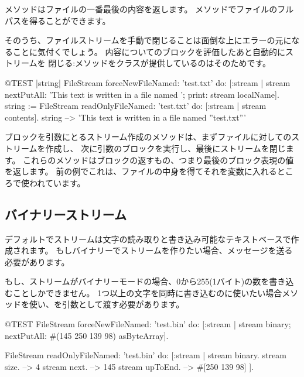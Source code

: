 \documentclass[a4paper,10pt,twoside]{book}
\begin{document}
メソッドはファイルの一番最後の内容を返します。
メソッドでファイルのフルパスを得ることができます。


そのうち、ファイルストリームを手動で閉じることは面倒な上にエラーの元になることに気付くでしょう。
内容についてのブロックを評価したあと自動的にストリームを
閉じる:メソッドをクラスが提供しているのはそのためです。


\begin{code}{@TEST |string|}
FileStream
    forceNewFileNamed: 'test.txt'
    do: [:stream |
        stream
            nextPutAll: 'This text is written in a file named ';
            print: stream localName].
string := FileStream
            readOnlyFileNamed: 'test.txt'
            do: [:stream | stream contents].
string --> 'This text is written in a file named ''test.txt'''
\end{code}

ブロックを引数にとるストリーム作成のメソッドは、まずファイルに対してのストリームを作成し、
次に引数のブロックを実行し、最後にストリームを閉じます。
これらのメソッドはブロックの返すもの、つまり最後のブロック表現の値を返します。
前の例でこれは、ファイルの中身を得てそれを変数に入れるところで使われています。

\subsection{バイナリーストリーム}


デフォルトでストリームは文字の読み取りと書き込み可能なテキストベースで作成されます。
もしバイナリーでストリームを作りたい場合、メッセージを送る必要があります。


もし、ストリームがバイナリーモードの場合、0から255(1バイト)の数を書き込むことしかできません。
1つ以上の文字を同時に書き込むのに使いたい場合メソッドを使い、を引数として渡す必要があります。

\begin{code}{@TEST}
FileStream
  forceNewFileNamed: 'test.bin'
  do: [:stream |
          stream
            binary;
            nextPutAll: #(145 250 139 98) asByteArray].

FileStream
  readOnlyFileNamed: 'test.bin'
  do: [:stream |
          stream binary.
          stream size.         --> 4
          stream next.         --> 145
          stream upToEnd. --> #[250 139 98]
      ].
\end{code}
\end{document}
